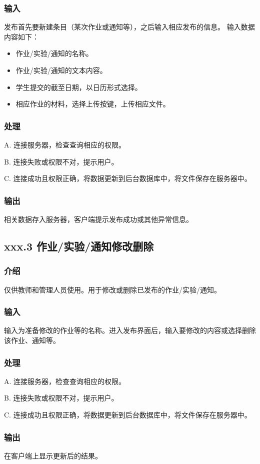 \subsubsection{输入}
 发布首先要新建条目（某次作业或通知等），之后输入相应发布的信息。
 输入数据内容如下：
     \begin{itemize}
 \item 作业/实验/通知的名称。
    \item 作业/实验/通知的文本内容。
    \item 学生提交的截至日期，以日历形式选择。
    \item 相应作业的材料，选择上传按键，上传相应文件。
    \end{itemize}
\subsubsection{处理}
A. 连接服务器，检查查询相应的权限。

B. 连接失败或权限不对，提示用户。

C. 连接成功且权限正确，将数据更新到后台数据库中，将文件保存在服务器中。

\subsubsection{输出}
相关数据存入服务器，客户端提示发布成功或其他异常信息。
\subsection{xxx.3 作业/实验/通知修改删除}
  \subsubsection{介绍}
仅供教师和管理人员使用。用于修改或删除已发布的作业/实验/通知。
\subsubsection{输入}
输入为准备修改的作业等的名称。进入发布界面后，输入要修改的内容或选择删除该作业、通知等。
\subsubsection{处理}
A. 连接服务器，检查查询相应的权限。

B. 连接失败或权限不对，提示用户。

C. 连接成功且权限正确，将数据更新到后台数据库中，将文件保存在服务器中。

\subsubsection{输出}
在客户端上显示更新后的结果。
